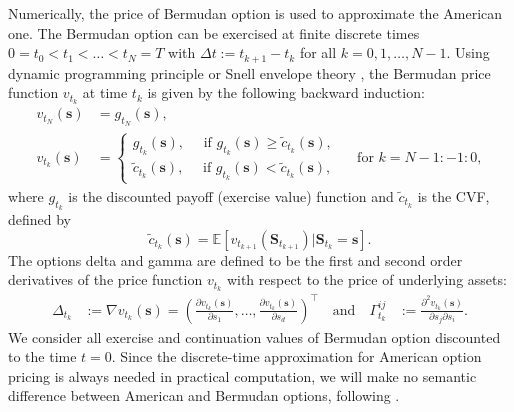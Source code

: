 \documentclass[10pt,a4paper]{amsart}
\numberwithin{equation}{section}
\numberwithin{algorithm}{section}
\theoremstyle{plain}
\theoremstyle{remark}
\begin{document}
Numerically, the price of Bermudan option is used to approximate the American one. The Bermudan option can be exercised at finite discrete times $0 = t_0 < t_1 < \dots < t_N = T$ with $\Delta t := t_{k+1} - t_k$ for all $k = 0,1,\dots, N-1$. Using dynamic programming principle or Snell envelope theory \cite[Section 1.8.4]{seydel2006tools}, the Bermudan price function ${v}_{t_k}$ at time $t_k$ is given by the following backward induction:
\begin{equation} \label{eq: backward induction}
    \begin{aligned}
        v_{t_N}(\mathbf{s}) &= g_{t_N}(\mathbf{s}), \\
        v_{t_k}(\mathbf{s}) &= \begin{cases}
            g_{t_k}(\mathbf{s}), \quad \text{ if } g_{t_k}(\mathbf{s}) \ge \tilde{c}_{t_k}(\mathbf{s}), \\
            \tilde{c}_{t_k}(\mathbf{s}), \quad \text{ if } g_{t_k}(\mathbf{s}) < \tilde{c}_{t_k}(\mathbf{s}),
        \end{cases} \quad \text{ for } k = N-1:-1:0,
    \end{aligned}
\end{equation}
where $g_{t_k}$ is the discounted payoff (exercise value) function and $\tilde{c}_{t_k}$ is the CVF, defined by
\begin{equation} \label{eq: continuation value function S}
    \tilde{c}_{t_k}(\mathbf{s}) = \mathbb{E}[v_{t_{k+1}}(\mathbf{S}_{t_{k+1}}) | \mathbf{S}_{t_k} = \mathbf{s}].
\end{equation}
The options delta and gamma are defined to be the first and second order derivatives of the price function $v_{t_k}$ with respect to the price of underlying assets:
\begin{equation} \label{eq: defi greeks}
    \begin{aligned}
        \Delta_{t_k} &:= \nabla v_{t_k}(\mathbf{s}) = \left(\frac{\partial v_{t_k}(\mathbf{s})}{\partial s_1}, \dots, \frac{\partial v_{t_k}(\mathbf{s})}{\partial s_d} \right)^\top\quad \mbox{and}\quad
        \Gamma^{ij}_{t_k} &:= \frac{\partial^2 v_{t_k}(\mathbf{s})}{\partial s_j \partial s_i}.
    \end{aligned}
\end{equation}
We consider all exercise and continuation values of Bermudan option discounted to the time $t = 0$. Since the discrete-time approximation for American option pricing is always needed in practical computation, we will make no semantic difference between American and Bermudan options, following \cite[p. 133]{guyon2013nonlinear}.
\end{document}
